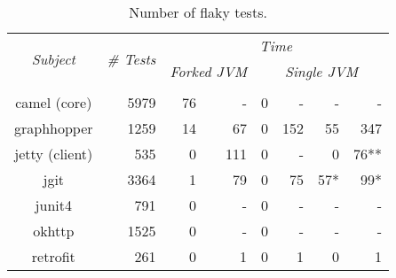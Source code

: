 \begin{table*}[t]
  \centering
  \begin{tabular}{|c|r|r|r|r|r|r|r|}
    \hline
    \multirow{2}{*}{\emph{Subject}} & \multirow{2}{*}{\emph{\# Tests}} &  \multicolumn{6}{c|}{\emph{Time}}\\
    \cline{3-8}
    & & \multicolumn{2}{c|}{\emph{Forked JVM}} & \multicolumn{4}{c|}{\emph{Single JVM}}   \\
    \cline{3-8}
    & & \multicolumn{1}{c|}{\Seq{}} & \multicolumn{1}{c|}{\ParClassSeqMeth{}} & \multicolumn{1}{c|}{\Seq{}} & \multicolumn{1}{c|}{\ParClassSeqMeth{}} & \multicolumn{1}{c|}{\SeqClassParMeth{}} & \multicolumn{1}{c|}{\ParClassParMeth{}}\\     \hline 
    camel (core) & 5979 & 76 & - & 0 & - & - & - \\
    \hline
    graphhopper & 1259 & 14 & 67 & 0 & 152 & 55 & 347 \\
    \hline
    jetty (client) & 535 & 0 & 111 & 0 & - & 0 & 76** \\
    \hline
    jgit & 3364 & 1 & 79 & 0 & 75 & 57* & 99* \\
    \hline
    junit4 & 791 & 0 & - & 0 & - & - & - \\
    \hline
    okhttp & 1525 & 0 & - & 0 & - & - & - \\
    \hline
    retrofit & 261 & 0 & 1 & 0 & 1 & 0 & 1 \\
    \hline
  \end{tabular}
  \caption{\label{table:failures}Number of flaky tests.}
\end{table*}

